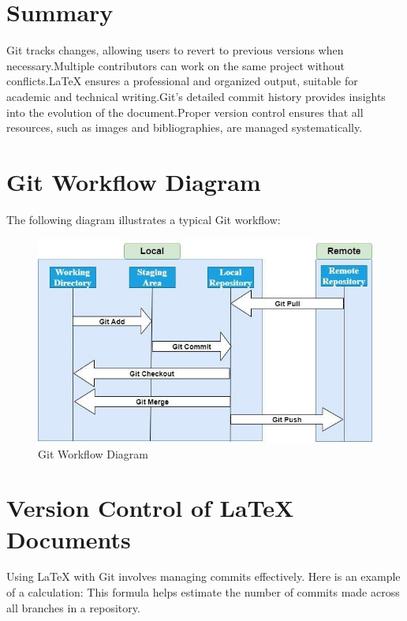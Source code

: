 \documentclass{article}
\begin{document}
\section{Summary}
Git tracks changes, allowing users to revert to previous versions when necessary.Multiple contributors can work on the same project without conflicts.LaTeX ensures a professional and organized output, suitable for academic and technical writing.Git's detailed commit history provides insights into the evolution of the document.Proper version control ensures that all resources, such as images and bibliographies, are managed systematically.

\section{Git Workflow Diagram}
The following diagram illustrates a typical Git workflow:
\begin{figure}[h]
    \centering
    \includegraphics[width=\textwidth]{git_workflow.jpg}
    \caption{Git Workflow Diagram}
    \label{fig:git_workflow}
\end{figure}

\section{Version Control of LaTeX Documents}
Using LaTeX with Git involves managing commits effectively. Here is an example of a calculation:
This formula helps estimate the number of commits made across all branches in a repository.
\end{document}
